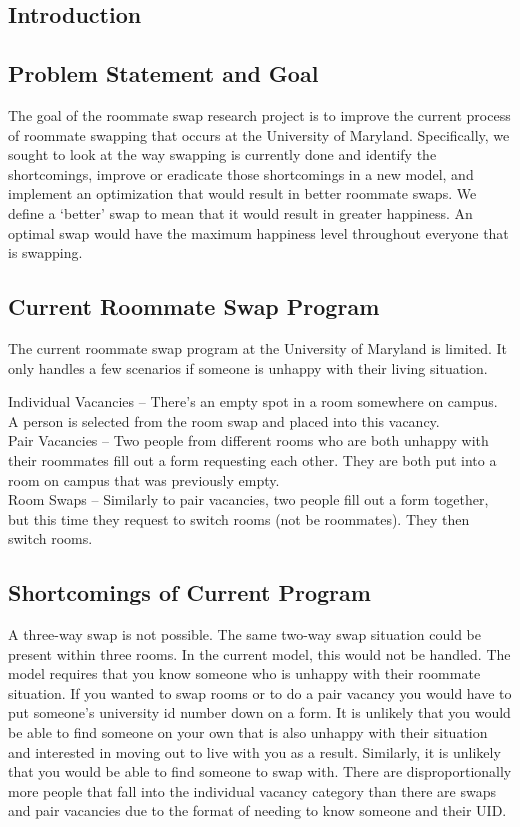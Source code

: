 \documentclass[12pt]{article}
\begin{document}
\begin{multicols}{2}

\section{Introduction}
\subsection{Problem Statement and Goal}
The goal of the roommate swap research project is to improve the current process of roommate swapping that occurs at the University of Maryland. Specifically, we sought to look at the way swapping is currently done and identify the shortcomings, improve or eradicate those shortcomings in a new model, and implement an optimization that would result in better roommate swaps. We define a ‘better’ swap to mean that it would result in greater happiness. An optimal swap would have the maximum happiness level throughout everyone that is swapping.

\subsection{Current Roommate Swap Program}
The current roommate swap program at the University of Maryland is limited. It only handles a few scenarios if someone is unhappy with their living situation.

Individual Vacancies – There’s an empty spot in a room somewhere on campus. A person is selected from the room swap and placed into this vacancy.\\
Pair Vacancies – Two people from different rooms who are both unhappy with their roommates fill out a form requesting each other. They are both put into a room on campus that was previously empty.\\
Room Swaps – Similarly to pair vacancies, two people fill out a form together, but this time they request to switch rooms (not be roommates). They then switch rooms.

\subsection{Shortcomings of Current Program}
A three-way swap is not possible. The same two-way swap situation could be present within three rooms. In the current model, this would not be handled.
The model requires that you know someone who is unhappy with their roommate situation. If you wanted to swap rooms or to do a pair vacancy you would have to put someone’s university id number down on a form. It is unlikely that you would be able to find someone on your own that is also unhappy with their situation and interested in moving out to live with you as a result. Similarly, it is unlikely that you would be able to find someone to swap with. There are disproportionally more people that fall into the individual vacancy category than there are swaps and pair vacancies due to the format of needing to know someone and their UID.


\end{multicols}
\end{document}
